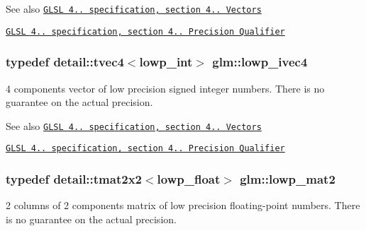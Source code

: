 \begin{DoxySeeAlso}{\-See also}
\href{http://www.opengl.org/registry/doc/GLSLangSpec.4.20.8.pdf}{\tt \-G\-L\-S\-L 4.. specification, section 4.. \-Vectors} 

\href{http://www.opengl.org/registry/doc/GLSLangSpec.4.20.8.pdf}{\tt \-G\-L\-S\-L 4.. specification, section 4.. \-Precision \-Qualifier} 
\end{DoxySeeAlso}
\hypertarget{group__core__precision_gaf6a3d7f4b43a36e905511bc0753e3158}{
\subsubsection[{lowp\-\_\-ivec4}]{\setlength{\rightskip}{0pt plus 5cm}typedef detail\-::tvec4$<$lowp\-\_\-int$>$ {\bf glm\-::lowp\-\_\-ivec4}}}\label{group__core__precision_gaf6a3d7f4b43a36e905511bc0753e3158}
4 components vector of low precision signed integer numbers. \-There is no guarantee on the actual precision.

\begin{DoxySeeAlso}{\-See also}
\href{http://www.opengl.org/registry/doc/GLSLangSpec.4.20.8.pdf}{\tt \-G\-L\-S\-L 4.. specification, section 4.. \-Vectors} 

\href{http://www.opengl.org/registry/doc/GLSLangSpec.4.20.8.pdf}{\tt \-G\-L\-S\-L 4.. specification, section 4.. \-Precision \-Qualifier} 
\end{DoxySeeAlso}
\hypertarget{group__core__precision_ga403348153f5cd7bd52598be409afdf47}{
\subsubsection[{lowp\-\_\-mat2}]{\setlength{\rightskip}{0pt plus 5cm}typedef detail\-::tmat2x2$<$lowp\-\_\-float$>$ {\bf glm\-::lowp\-\_\-mat2}}}\label{group__core__precision_ga403348153f5cd7bd52598be409afdf47}
2 columns of 2 components matrix of low precision floating-\/point numbers. \-There is no guarantee on the actual precision.


